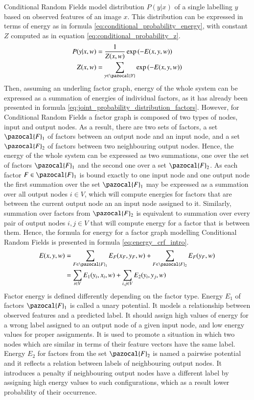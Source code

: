 Conditional Random Fields model distribution $P(y|x)$ of a single labelling $y$ based on observed features of an image $x$. This distribution can be expressed in terms of energy as in formula \ref{eq:conditional_probability_energy}, with constant $Z$ computed as in equation \ref{eq:conditional_probability_z}.
\begin{align}
    \label{eq:conditional_probability_energy}
    P(y|x,w) &= \frac{1}{Z(x,w)} \exp{(-E(x,y,w))} \\
    Z(x,w) &= \sum_{y \in \pazocal{Y}}{\exp{(-E(x,y,w))}}
    \label{eq:conditional_probability_z}
\end{align}
Then, assuming an underling factor graph, energy of the whole system can be expressed as a summation of energies of individual factors, as it has already been presented in formula \ref{eq:joint_probability_distribution_factors}. However, for Conditional Random Fields a factor graph is composed of two types of nodes, input and output nodes. As a result, there are two sets of factors, a set $\pazocal{F}_1$ of factors between an output node and an input node, and a set $\pazocal{F}_2$ of factors between two neighbouring output nodes. Hence, the energy of the whole system can be expressed as two summations, one over the set of factors $\pazocal{F}_1$ and the second one over a set $\pazocal{F}_2$. As each factor $F \in \pazocal{F}_1$ is bound exactly to one input node and one output node the first summation over the set $\pazocal{F}_1$ may be expressed as a summation over all output nodes $i \in V$, which will compute energies for factors that are between the current output node an an input node assigned to it. Similarly, summation over factors from $\pazocal{F}_2$ is equivalent to summation over every pair of output nodes $i,j \in V$ that will compute energy for a factor that is between them. Hence, the formula for energy for a factor graph modelling Conditional Random Fields is presented in formula \ref{eq:energy_crf_intro}.
\begin{equation}
    \label{eq:energy_crf_intro}
    \begin{aligned}
        E(x,y,w) &= \sum_{F \in \pazocal{F}_1}E_F(x_F,y_F,w) + \sum_{F \in \pazocal{F}_2}E_F(y_F,w) \\
        &=\sum_{i\in V}{E_1}({y_i},{x_i},w) + \sum_{i,j \in V}{E_2}({y_i},{y_j},w)
    \end{aligned}
\end{equation}
Factor energy is defined differently depending on the factor type. Energy $E_1$ of factors $\pazocal{F}_1$ is called a unary potential. It models a relationship between observed features and a predicted label. It should assign high values of energy for a wrong label assigned to an output node of a given input node, and low energy values for proper assignments. It is used to promote a situation in which two nodes which are similar in terms of their feature vectors have the same label. Energy $E_2$ for factors from the set $\pazocal{F}_2$ is named a pairwise potential and it reflects a relation between labels of neighbouring output nodes. It introduces a penalty if neighbouring output nodes have a different label by assigning high energy values to such configurations, which as a result lower probability of their occurrence.
